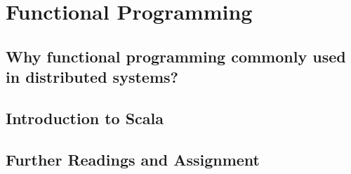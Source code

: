 \section{Functional Programming}
\subsection{Why functional programming commonly used in distributed systems?}
\subsection{Introduction to Scala}
\subsection{Further Readings and Assignment}
